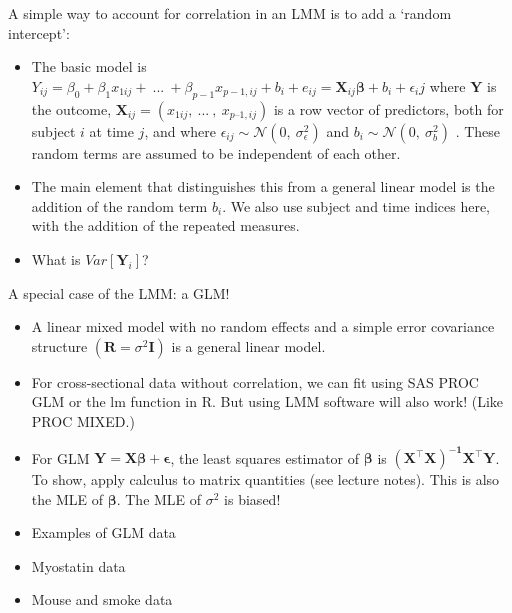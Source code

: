 \documentclass[
  9pt,
  ignorenonframetext,
]{beamer}
\begin{document}
\begin{frame}{A simple way to account for correlation in an LMM is to
add a `random intercept':}
\protect\hypertarget{a-simple-way-to-account-for-correlation-in-an-lmm-is-to-add-a-random-intercept}{}
\begin{itemize}
\item
  The basic model is
  \(Y_{ij} = \beta_0 + \beta_1 x_{1ij} +\ ...\ + \beta_{p-1} x_{p-1, ij} + b_i + e_{ij} = \pmb X_{ij} \pmb \beta + b_i +\epsilon_ij\)
  where \(\pmb Y\) is the outcome,
  \(\pmb X_{ij} = (x_{1ij},\ ...\ ,\ x_{p–1,ij})\) is a row vector of
  predictors, both for subject \(i\) at time \(j\), and where
  \(\epsilon_{ij} \sim \mathcal N (0,\ \sigma_\epsilon^2)\) and
  \(b_{i} \sim \mathcal N (0,\ \sigma_b^2)\) . These random terms are
  assumed to be independent of each other.
\item
  The main element that distinguishes this from a general linear model
  is the addition of the random term \(b_i\). We also use subject and
  time indices here, with the addition of the repeated measures.
\item
  What is \(Var[\pmb Y_i]\)?
\end{itemize}
\end{frame}

\begin{frame}{A special case of the LMM: a GLM!}
\protect\hypertarget{a-special-case-of-the-lmm-a-glm}{}
\begin{itemize}
\item
  A linear mixed model with no random effects and a simple error
  covariance structure \((\pmb R=σ^2 \pmb I)\) is a general linear
  model.
\item
  For cross-sectional data without correlation, we can fit using SAS
  PROC GLM or the lm function in R. But using LMM software will also
  work! (Like PROC MIXED.)
\item
  For GLM \(\pmb Y= \pmb X \pmb \beta + \pmb \epsilon\), the least
  squares estimator of \(\pmb \beta\) is
  \(\pmb {(X^{\top}X)^{-1}X^{\top}Y}\). To show, apply calculus to
  matrix quantities (see lecture notes). This is also the MLE of
  \(\pmb \beta\). The MLE of \(\sigma^2\) is biased!
\item
  Examples of GLM data
\item
  Myostatin data
\item
  Mouse and smoke data
\end{itemize}
\end{frame}
\end{document}
